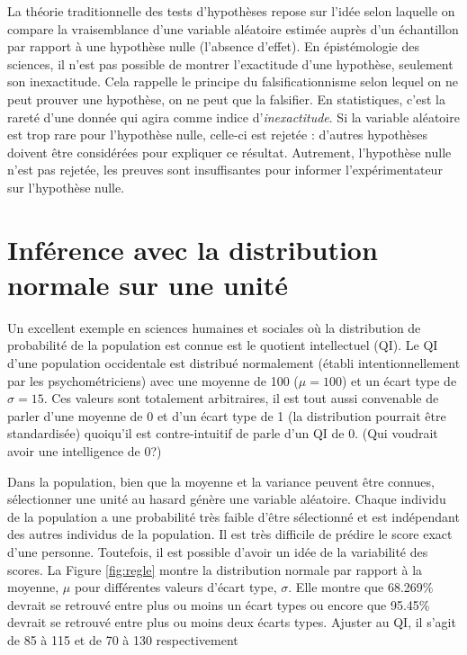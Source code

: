 \documentclass[
]{book}
\begin{document}
La théorie traditionnelle des tests d'hypothèses repose sur l'idée selon laquelle on compare la vraisemblance d'une variable aléatoire estimée auprès d'un échantillon par rapport à une hypothèse nulle (l'absence d'effet). En épistémologie des sciences, il n'est pas possible de montrer l'exactitude d'une hypothèse, seulement son inexactitude. Cela rappelle le principe du falsificationnisme selon lequel on ne peut prouver une hypothèse, on ne peut que la falsifier. En statistiques, c'est la rareté d'une donnée qui agira comme indice d'\emph{inexactitude}. Si la variable aléatoire est trop rare pour l'hypothèse nulle, celle-ci est rejetée : d'autres hypothèses doivent être considérées pour expliquer ce résultat. Autrement, l'hypothèse nulle n'est pas rejetée, les preuves sont insuffisantes pour informer l'expérimentateur sur l'hypothèse nulle.

\hypertarget{infuxe9rence-avec-la-distribution-normale-sur-une-unituxe9}{%
\section{Inférence avec la distribution normale sur une unité}\label{infuxe9rence-avec-la-distribution-normale-sur-une-unituxe9}}

Un excellent exemple en sciences humaines et sociales où la distribution de probabilité de la population est connue est le quotient intellectuel (QI). Le QI d'une population occidentale est distribué normalement (établi intentionnellement par les psychométriciens) avec une moyenne de 100 (\(\mu=100\)) et un écart type de \(\sigma = 15\). Ces valeurs sont totalement arbitraires, il est tout aussi convenable de parler d'une moyenne de 0 et d'un écart type de 1 (la distribution pourrait être standardisée) quoiqu'il est contre-intuitif de parle d'un QI de 0. (Qui voudrait avoir une intelligence de 0?)

Dans la population, bien que la moyenne et la variance peuvent être connues, sélectionner une unité au hasard génère une variable aléatoire. Chaque individu de la population a une probabilité très faible d'être sélectionné et est indépendant des autres individus de la population. Il est très difficile de prédire le score exact d'une personne. Toutefois, il est possible d'avoir un idée de la variabilité des scores. La Figure \ref{fig:regle} montre la distribution normale par rapport à la moyenne, \(\mu\) pour différentes valeurs d'écart type, \(\sigma\). Elle montre que 68.269\% devrait se retrouvé entre plus ou moins un écart types ou encore que 95.45\% devrait se retrouvé entre plus ou moins deux écarts types. Ajuster au QI, il s'agit de 85 à 115 et de 70 à 130 respectivement
\end{document}

